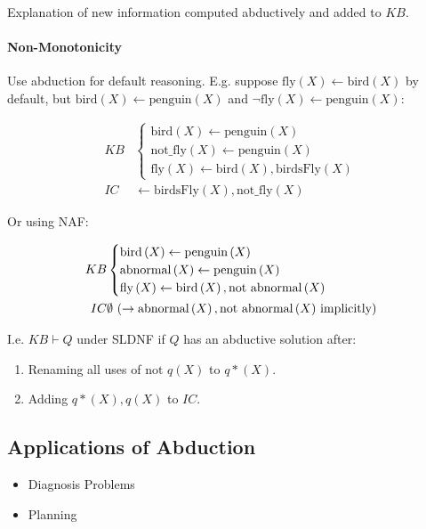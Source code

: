 \documentclass[twocolumn,english]{article}
\begin{document}
Explanation of new information computed abductively and added to $KB$.

\paragraph{Non-Monotonicity}

Use abduction for default reasoning. E.g. suppose $\text{fly}\left(X\right)\leftarrow\text{bird}\left(X\right)$
by default, but $\text{bird}\left(X\right)\leftarrow\text{penguin}\left(X\right)$
and $\lnot\text{fly}\left(X\right)\leftarrow\text{penguin}\left(X\right)$:

\begin{align*}
KB & \begin{cases}
\text{bird}\left(X\right)\leftarrow\text{penguin}\left(X\right)\\
\text{not\_fly}\left(X\right)\leftarrow\text{penguin}\left(X\right)\\
\text{fly}\left(X\right)\leftarrow\text{bird}\left(X\right),\text{birdsFly}\left(X\right)
\end{cases}\\
IC & \leftarrow\text{birdsFly}\left(X\right),\text{not\_fly}\left(X\right)
\end{align*}

Or using NAF:

\begin{align*}
KB & \begin{cases}
\text{bird}\left(X\right)\leftarrow\text{penguin}\left(X\right)\\
\text{abnormal}\left(X\right)\leftarrow\text{penguin}\left(X\right)\\
\text{fly}\left(X\right)\leftarrow\text{bird}\left(X\right),\text{not abnormal}\left(X\right)
\end{cases}\\
IC & \emptyset\text{ (\ensuremath{\rightarrow\text{abnormal}\left(X\right),\text{not abnormal}\left(X\right)} implicitly)}
\end{align*}

I.e. $KB\vdash Q$ under SLDNF if $Q$ has an abductive solution after: 
\begin{enumerate}
\item Renaming all uses of $\text{not }q\left(X\right)$ to $q*\left(X\right)$. 
\item Adding $q*\left(X\right),q\left(X\right)$ to $IC$. 
\end{enumerate}

\subsection{Applications of Abduction}
\begin{itemize}
\item Diagnosis Problems 
\item Planning 
\end{itemize}
\end{document}
